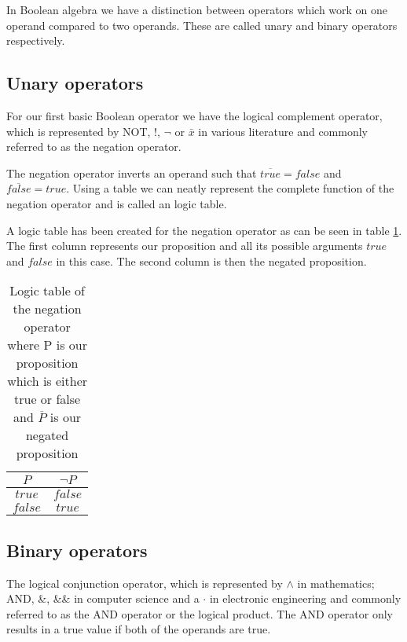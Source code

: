     In Boolean algebra we have a distinction between operators which work on one operand compared to two operands. These are called unary and binary operators respectively.
    
    \subsection{Unary operators}
    
    For our first basic Boolean operator we have the logical complement operator, which is represented by NOT, !, $\neg$ or $\bar{x}$ in various literature and commonly referred to as the negation operator. 
    
    The negation operator inverts an operand such that $\overline{true} = false$ and $\overline{false} = true$.
    Using a table we can neatly represent the complete function of the negation operator and is called an logic table.
    
    A logic table has been created for the negation operator as can be seen in table \ref{LogicTable:Negation}.  The first column represents our proposition and all its possible arguments $true$ and $false$ in this case. The second column is then the negated proposition.
    
    \begin{table}[h!]
        \centering
        \begin{tabular}{|c|c|}
        	\hline
        	  $P$   & $\neg{P}$ \\ \hline
        	$true$  &    $false$     \\ \hline
        	$false$ &     $true$     \\ \hline
        \end{tabular}
        \caption{Logic table of the negation operator where P is our proposition which is either true or false and $\overline{P}$ is our negated proposition}
        \label{LogicTable:Negation}
    \end{table}

    \subsection{Binary operators}
    
    The logical conjunction operator, which is represented by $\wedge$ in mathematics; AND, \&, \&\& in computer science and a $\cdot$ in electronic engineering and commonly referred to as the AND operator or the logical product. The AND operator only results in a true value if both of the operands are true.
    
